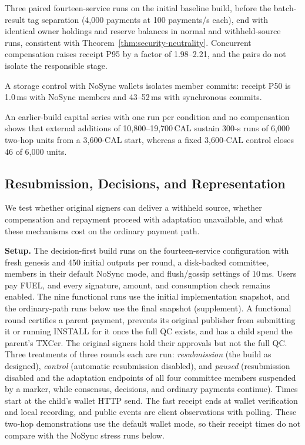 Three paired
fourteen-service runs on the initial baseline build, before the batch-result
tag separation (4,000 payments at 100 payments/s each), end with identical
owner holdings and reserve balances in normal and withheld-source runs,
consistent with Theorem~\ref{thm:security-neutrality}. Concurrent compensation
raises receipt P95 by a factor of 1.98--2.21, and the pairs do not isolate
the responsible stage.

A storage control with NoSync wallets isolates member
commits: receipt P50 is 1.0\,ms with NoSync members and 43--52\,ms with
synchronous commits.

An earlier-build capital series with one run per
condition and no compensation shows that external additions of
10,800--19,700\,CAL sustain 300-s runs of 6,000 two-hop units from a
3,600-CAL start, whereas a fixed 3,600-CAL control closes 46 of 6,000 units.

\subsection{Resubmission, Decisions, and Representation}
\label{sec:eval-repair}

We test whether original signers can deliver a withheld source, whether
compensation and repayment proceed with adaptation unavailable, and what
these mechanisms cost on the ordinary payment path.

\noindent\textbf{Setup.}
The decision-first build runs on the fourteen-service configuration with fresh genesis and
450 initial outputs per round, a disk-backed committee, members in their
default NoSync mode, and flush/gossip settings of 10\,ms. Users pay FUEL, and
every signature, amount, and consumption check remains enabled. The nine
functional runs use the initial implementation snapshot, and the ordinary-path
runs below use the final snapshot (supplement). A functional round certifies a
parent payment, prevents its original publisher from submitting it or running INSTALL
for it once the full QC exists, and has a child spend the parent's TXCer. The
original signers hold their approvals but not the full QC. Three treatments
of three rounds each are run: \emph{resubmission} (the build as designed),
\emph{control} (automatic resubmission disabled), and \emph{paused}
(resubmission disabled and the adaptation endpoints of all four committee
members suspended by a marker, while consensus, decisions, and ordinary
payments continue). Times start at the child's wallet HTTP send. The fast
receipt ends at wallet verification and local recording, and public events are
client observations with polling. These two-hop demonstrations use the default
wallet mode, so their receipt times do not compare with the NoSync stress runs
below.


